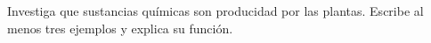 Investiga que sustancias químicas son producidad por las plantas. Escribe al menos tres ejemplos y explica su función.

\begin{solutionbox}{5cm}

\end{solutionbox}
